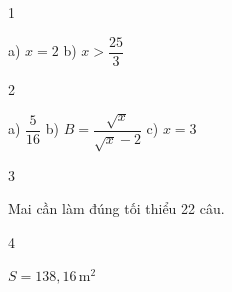 \begin{Solbook}{1}
 \par \noindent  a) $x=2$ \hspace {2cm} b) $x>\dfrac {25}{3}$  \hfill \qedEX 
\end{Solbook}
\begin{Solbook}{2}
 \par \noindent  a) $\dfrac {5}{16}$ \hspace {2cm} b) $B=\dfrac {\sqrt {x}}{\sqrt {x}-2}$ \hspace {2cm} c) $x=3$  \hfill \qedEX 
\end{Solbook}
\begin{Solbook}{3}
 \par \noindent  Mai cần làm đúng tối thiểu 22 câu.  \hfill \qedEX 
\end{Solbook}
\begin{Solbook}{4}
 \par \noindent  $S=138,16\,\text {m}^2$  \hfill \qedEX 
\end{Solbook}

